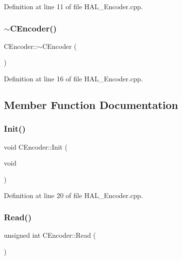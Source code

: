 Definition at line 11 of file H\+A\+L\+\_\+\+Encoder.\+cpp.

\mbox{\label{class_c_encoder_aa6b7126b6e24bd115348fa6243756f47}} 
\subsubsection{\texorpdfstring{$\sim$CEncoder()}{~CEncoder()}}
{\footnotesize\ttfamily C\+Encoder\+::$\sim$\+C\+Encoder (\begin{DoxyParamCaption}{ }\end{DoxyParamCaption})}



Definition at line 16 of file H\+A\+L\+\_\+\+Encoder.\+cpp.



\subsection{Member Function Documentation}
\mbox{\label{class_c_encoder_a99a1c676b3fd3e6f253b273b2d740aab}} 
\subsubsection{\texorpdfstring{Init()}{Init()}}
{\footnotesize\ttfamily void C\+Encoder\+::\+Init (\begin{DoxyParamCaption}\item[{void}]{ }\end{DoxyParamCaption})}



Definition at line 20 of file H\+A\+L\+\_\+\+Encoder.\+cpp.

\mbox{\label{class_c_encoder_aba0cf6ffa20d8c3c4028c2e380ff73b3}} 
\subsubsection{\texorpdfstring{Read()}{Read()}}
{\footnotesize\ttfamily unsigned int C\+Encoder\+::\+Read (\begin{DoxyParamCaption}{ }\end{DoxyParamCaption})}

